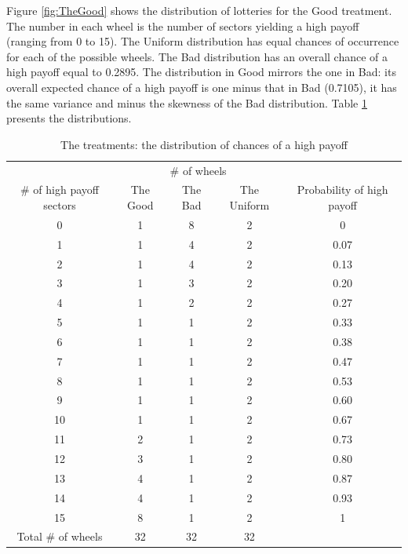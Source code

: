 \documentclass[12pt, a4paper]{article}
\begin{document}
Figure \ref{fig:TheGood} shows the distribution of lotteries for the Good treatment.
The number in each wheel is the number of sectors yielding a high payoff (ranging from 0 to 15).
The Uniform distribution has equal chances of occurrence for each of the possible wheels.
The Bad distribution has an overall chance of a high payoff equal to 0.2895.
The distribution in Good mirrors the one in Bad: its overall expected chance of a high payoff is one minus that in Bad (0.7105), it has the same variance and minus the skewness of the Bad distribution.
Table \ref{tab:distr} presents the distributions.


\begin{table}[htbp]
\centering \caption{The treatments: the distribution of chances of a high payoff}\label{tab:distr}
\begin{threeparttable}
\begin{tabular}
   {@{}
	*5c
	@{}
	}
\toprule
	&	\multicolumn{3}{c}{\# of wheels}&\\
	\cmidrule{2-4}
\# of high payoff sectors 	&	{The Good}&{The Bad}&	{The Uniform}& {Probability of high payoff}\\
\midrule
0	    &	1&       8&	2& 0   \\
1	    &	1&       4&	2& 0.07\\
2	    &	1&       4&	2& 0.13\\
3	    &	1&       3&	2& 0.20\\
4	    &	1&       2&	2& 0.27\\
5	    &	1&       1&	2& 0.33\\
6	    &	1&       1&	2& 0.38\\
7	    &	1&       1&	2& 0.47\\
8	    &	1&       1&	2& 0.53\\
9	    &	1&       1&	2& 0.60\\
10	    & 1&       1&	2& 0.67\\
11	    & 2&       1&	2& 0.73\\
12	    &	3&       1&	2& 0.80\\
13	    &	4&       1&	2& 0.87\\
14	    &	4&       1&	2& 0.93\\
15	    &	8&       1&	2& 1   \\
\midrule
Total \# of wheels	&	32&       32&	32&\\
\bottomrule

\end{tabular}
\end{threeparttable}
\end{table}
\end{document}
